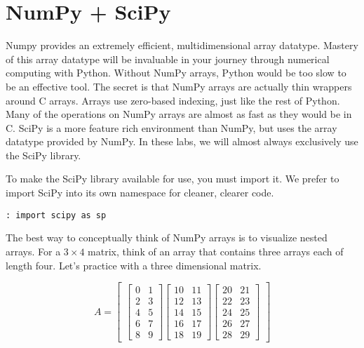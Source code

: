 \label{Lab:PythonAdvanced}

\section*{NumPy + SciPy}
Numpy provides an extremely efficient, multidimensional array datatype.  Mastery of this array datatype will be invaluable in your journey through numerical computing with Python.  Without NumPy arrays, Python would be too slow to be an effective tool.  The secret is that NumPy arrays are actually thin wrappers around C arrays.  Arrays use zero-based indexing, just like the rest of Python.  Many of the operations on NumPy arrays are almost as fast as they would be in C.  SciPy is a more feature rich environment than NumPy, but uses the array datatype provided by NumPy.  In these labs, we will almost always exclusively use the SciPy library.

To make the SciPy library available for use, you must import it.  We prefer to import SciPy into its own namespace for cleaner, clearer code.
\begin{lstlisting}[style=python]
: import scipy as sp
\end{lstlisting}

The best way to conceptually think of NumPy arrays is to visualize nested arrays.  For a $3\times4$ matrix, think of an array that contains three arrays each of length four.  Let's practice with a three dimensional matrix.

\[
A = \begin{bmatrix}
\begin{bmatrix}
0 & 1 \\
2 & 3 \\
4 & 5 \\
6 & 7 \\
8 & 9
\end{bmatrix}
\begin{bmatrix}
10 & 11 \\
12 & 13 \\
14 & 15 \\
16 & 17 \\
18 & 19
\end{bmatrix}
\begin{bmatrix}
20 & 21 \\
22 & 23 \\
24 & 25 \\
26 & 27 \\
28 & 29
\end{bmatrix}
\end{bmatrix}
\]

